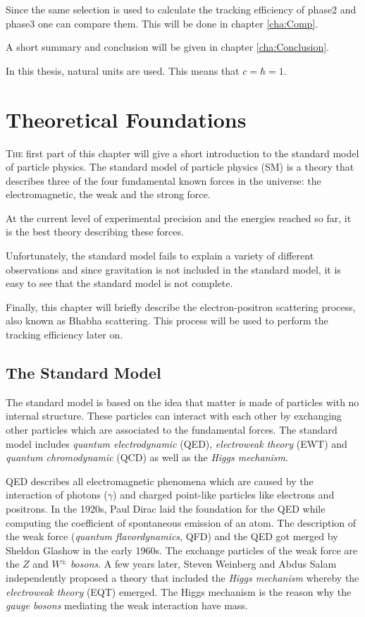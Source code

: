 \documentclass[a4paper,11pt,twosided,final,german,openbib,pdftex,listof=totoc,bibliography=totoc]{scrbook}
\begin{document}
Since the same selection is used to calculate the tracking efficiency of phase2 and phase3 one can compare them. This will be done in chapter \ref{cha:Comp}.

A short summary and conclusion will be given in chapter \ref{cha:Conclusion}.
\newline 

In this thesis, natural units are used. This means that $c = \hbar = 1$.
\newline


\chapter{Theoretical Foundations}
\label{cha:SM}

\lettrine{T}{he} first part of this chapter will give  a short introduction to the standard model of particle physics. The standard model of particle physics (SM) is a theory that describes three of the four fundamental known forces in the universe: the electromagnetic, the weak and the strong force. 

 At the current level of experimental precision and the energies reached so far, it is the best theory describing these forces.
 
 Unfortunately, the standard model fails to explain a variety of different observations and since gravitation is not included in the standard model, it is easy to see that the standard model is not complete.
 
 
 Finally, this chapter will briefly describe the electron-positron scattering process, also known as Bhabha scattering. This process will be used to perform the tracking efficiency later on.
 
 
\section{The Standard Model}
\label{sec:SM}

The standard model is based on the idea that matter is made of particles with no internal structure. These particles can interact with each other by exchanging other particles which are associated to the fundamental forces. The standard model includes \textit{quantum electrodynamic} (QED), \textit{electroweak theory} (EWT) and \textit{quantum chromodynamic} (QCD) as well as the \textit{Higgs mechanism}.
\newline

QED describes all electromagnetic phenomena which are caused by the interaction of photons ($\gamma$) and charged point-like particles like electrons and positrons. In the 1920s, Paul Dirac laid the foundation for the QED while computing the coefficient of spontaneous emission of an atom. The description of the weak force (\textit{quantum flavordynamics}, QFD) and the QED got merged by Sheldon Glashow in the early 1960s. The exchange particles of the weak force are the $Z$ and $W^{\pm}$ \textit{bosons}. A few years later, Steven Weinberg and Abdus Salam independently proposed a theory that included the \textit{Higgs mechanism} whereby the \textit{electroweak theory} (EQT) emerged. The Higgs mechanism is the reason why the \textit{gauge bosons} mediating the weak interaction have mass.
\end{document}
